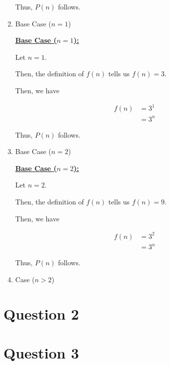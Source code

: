 \documentclass[12pt]{article}
\begin{document}
\begin{mdframed}
\begin{enumerate}[1.]
\begin{mdframed}
        \bigskip

        Thus, $P(n)$ follows.
        \end{mdframed}

        \item Base Case ($n = 1$)

        \begin{mdframed}
        \underline{\textbf{Base Case ($n = 1$):}}

        \bigskip

        Let $n = 1$.

        \bigskip

        Then, the definition of $f(n)$ tells us $f(n) = 3$.

        \bigskip

        Then, we have

        \begin{align}
            f(n) &= 3^1\\
            &= 3^n
        \end{align}

        \bigskip

        Thus, $P(n)$ follows.

        \end{mdframed}

        \item Base Case ($n = 2$)

        \begin{mdframed}
        \underline{\textbf{Base Case ($n = 2$):}}

        \bigskip

        Let $n = 2$.

        \bigskip

        Then, the definition of $f(n)$ tells us $f(n) = 9$.

        \bigskip

        Then, we have

        \begin{align}
            f(n) &= 3^2\\
            &= 3^n
        \end{align}

        \bigskip

        Thus, $P(n)$ follows.

        \end{mdframed}

        \item Case ($n > 2$)
    \end{enumerate}

\end{mdframed}

\section*{Question 2}

\section*{Question 3}
\end{document}
